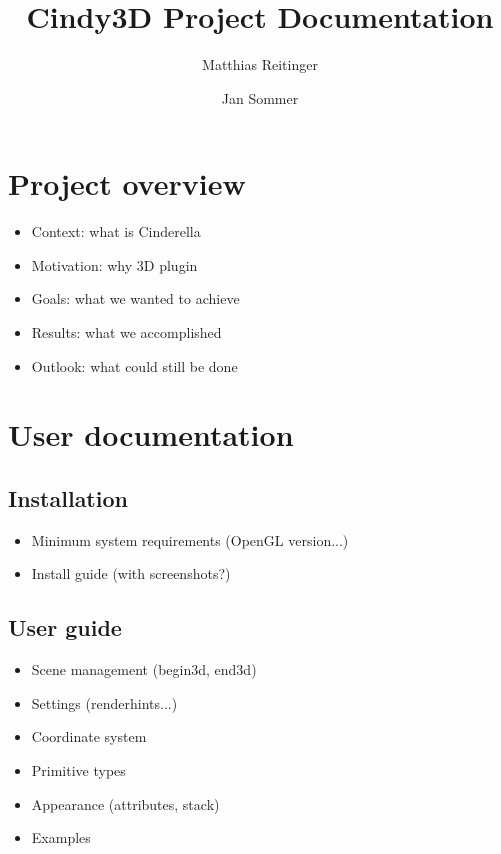 \documentclass{scrartcl}
\title{Cindy3D Project Documentation}
\author{Matthias Reitinger \and Jan Sommer}
\begin{document}
\maketitle

\newpage

\tableofcontents

\newpage

\section{Project overview}

\begin{itemize}
\item Context: what is Cinderella
\item Motivation: why 3D plugin
\item Goals: what we wanted to achieve
\item Results: what we accomplished
\item Outlook: what could still be done
\end{itemize}

\section{User documentation}

\subsection{Installation}

\begin{itemize}
\item Minimum system requirements (OpenGL version...)
\item Install guide (with screenshots?)
\end{itemize}

\subsection{User guide}

\begin{itemize}
\item Scene management (begin3d, end3d)
\item Settings (renderhints...)
\item Coordinate system
\item Primitive types
\item Appearance (attributes, stack)
\item Examples
\end{itemize}
\end{document}
